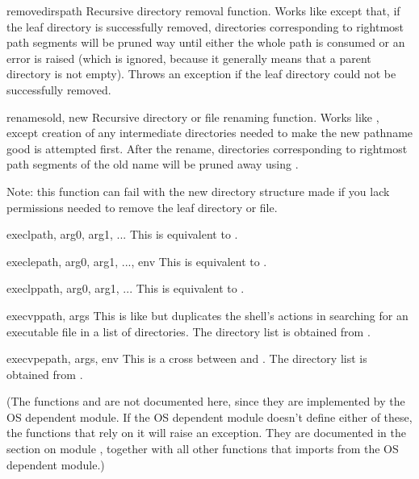 \begin{funcdesc}{removedirs}{path}
Recursive directory removal function.  Works like
 except that, if the leaf directory is
successfully removed, directories corresponding to rightmost path
segments will be pruned way until either the whole path is consumed or
an error is raised (which is ignored, because it generally means that
a parent directory is not empty).  Throws an 
exception if the leaf directory could not be successfully removed.
\end{funcdesc}

\begin{funcdesc}{renames}{old, new}
Recursive directory or file renaming function.
Works like , except creation of any intermediate
directories needed to make the new pathname good is attempted first.
After the rename, directories corresponding to rightmost path segments
of the old name will be pruned away using .

Note: this function can fail with the new directory structure made if
you lack permissions needed to remove the leaf directory or file.
\end{funcdesc}

\begin{funcdesc}{execl}{path, arg0, arg1, ...}
This is equivalent to
.
\end{funcdesc}

\begin{funcdesc}{execle}{path, arg0, arg1, ..., env}
This is equivalent to
.
\end{funcdesc}

\begin{funcdesc}{execlp}{path, arg0, arg1, ...}
This is equivalent to
.
\end{funcdesc}

\begin{funcdesc}{execvp}{path, args}
This is like  but duplicates
the shell's actions in searching for an executable file in a list of
directories.  The directory list is obtained from
.
\end{funcdesc}

\begin{funcdesc}{execvpe}{path, args, env}
This is a cross between  and .
The directory list is obtained from .
\end{funcdesc}

(The functions  and  are not
documented here, since they are implemented by the OS dependent
module.  If the OS dependent module doesn't define either of these,
the functions that rely on it will raise an exception.  They are
documented in the section on module , together with all
other functions that  imports from the OS dependent module.)
